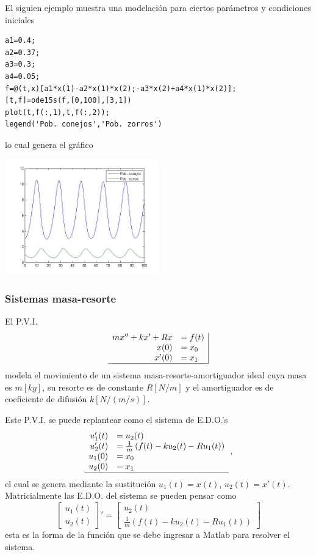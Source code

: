 \documentclass[11pt]{article}
\begin{document}
El siguien ejemplo muestra una modelaci\'on para ciertos par\'ametros y condiciones iniciales
\begin{lstlisting}
a1=0.4;
a2=0.37;
a3=0.3;
a4=0.05;
f=@(t,x)[a1*x(1)-a2*x(1)*x(2);-a3*x(2)+a4*x(1)*x(2)];
[t,f]=ode15s(f,[0,100],[3,1])
plot(t,f(:,1),t,f(:,2));
legend('Pob. conejos','Pob. zorros')
\end{lstlisting}
lo cual genera el gr\'afico
\begin{center}
\includegraphics[width=0.5\textwidth]{eje4.jpg}
\end{center}

\subsubsection{Sistemas masa-resorte}
El P.V.I. 
$$
\begin{array}{rl|}
mx''+kx'+Rx	&=f(t)\\
x(0)	&=x_0\\
x'(0)	&=x_1\\\hline
\end{array}
$$
modela el movimiento de un sistema masa-resorte-amortiguador ideal cuya masa es $m[kg]$, su resorte es de constante $R[N/m]$ y el amortiguador es de coeficiente de difusión $k[N/(m/s)]$.

Este P.V.I. se puede replantear como el sistema de E.D.O.'s
$$
\begin{array}{rl}
u_1'(t)	&=u_2(t) \\
u_2'(t)	&=\frac{1}{m} \left( f(t)-ku_2(t)-Ru_1(t)\right)\\
u_1(0)	&=x_0\\
u_2(0)	&=x_1\\ \hline
\end{array}\,,
$$
el cual se genera mediante la sustituci\'on $u_1(t)=x(t)$, $u_2(t)=x'(t)$.  Matricialmente las E.D.O. del sistema se pueden pensar como
$$
\begin{bmatrix}
u_1(t)\\u_2(t)
\end{bmatrix}'
=
\begin{bmatrix}
u_2(t)\\\frac{1}{m} \left( f(t)-ku_2(t)-Ru_1(t)\right)
\end{bmatrix}
$$
esta es la forma de la funci\'on que se debe ingresar a Matlab para resolver el sistema.
\end{document}

